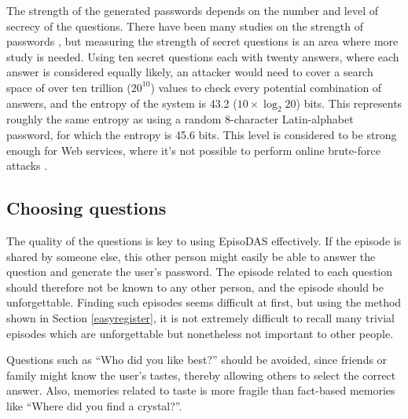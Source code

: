 \documentclass[sigconf]{acmart}
\begin{document}
The strength of the generated passwords depends on the number and 
level of secrecy of the questions.
%
There have been many studies on the strength of passwords
\cite{Hayashi:2011:DSP:1978942.1979326}\cite{Komanduri:2011:PPM:1978942.1979321}, %
but measuring the strength of secret questions is an area where more study is needed.
Using ten secret questions each with twenty answers, where each answer is considered equally likely,
an attacker would need to cover a search space of over ten trillion ($20^{10}$) values to check
every potential combination of answers,
and the entropy of the system is 43.2 ($10 \times \log_2 20$) bits.  %
%
This represents roughly the same entropy as using a random 8-character Latin-alphabet
password, for which the entropy is 45.6 bits.
This level is considered to be strong enough for Web services,
where it's not possible to perform online brute-force attacks \cite{Florencio:2007:SWP:1361419.1361429}.
  
\subsection{Choosing questions}

The quality of the questions is key to using EpisoDAS effectively.  If
the episode is shared by someone else, this other person might easily
be able to answer the question and generate the user's password.
%
The episode related to each question should therefore not be known to any other person,
and the episode should be unforgettable.
%
Finding such episodes seems difficult at first,
but using the method shown in Section \ref{easyregister},
it is not extremely difficult to recall
many trivial episodes which are unforgettable but
nonetheless not important to other people.

Questions such as ``Who did you like best?'' should be avoided,
since friends or family might know the user's tastes, thereby allowing 
others to select the correct answer.
Also, memories related to taste is more fragile than fact-based memories like
``Where did you find a crystal?''.

% 
\end{document}
